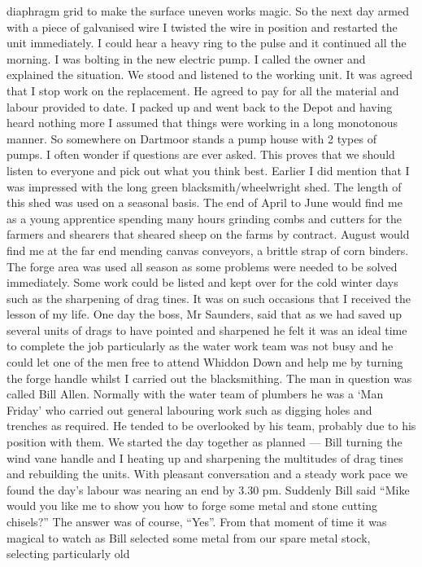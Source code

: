 diaphragm grid to make the surface uneven works magic. So the next day armed
with a piece of galvanised wire I twisted the wire in position and restarted
the unit immediately. I could hear a heavy ring to the pulse and it continued
all the morning. I was bolting in the new electric pump. I called the owner
and explained the situation. We stood and listened to the working unit. It
was agreed that I stop work on the replacement. He agreed to pay for all the
material and labour provided to date. I packed up and went back to the Depot
and having heard nothing more I assumed that things were working in a long
monotonous manner. So somewhere on Dartmoor stands a pump house with 2 types
of pumps.  I often wonder if questions are ever asked. This proves that we
should listen to everyone and pick out what you think best. Earlier I did
mention that I was impressed with the long green blacksmith/wheelwright shed.
The length of this shed was used on a seasonal basis. The end of April to June
would find me as a young apprentice spending many hours grinding combs and
cutters for the farmers and shearers that sheared sheep on the farms by
contract. August would find me at the far end mending canvas conveyors, a
brittle strap of corn binders. The forge area was used all season as some
problems were needed to be solved immediately. Some work could be listed and
kept over for the cold winter days such as the sharpening of drag tines. It
was on such occasions that I received the lesson of my life. One day the boss,
Mr Saunders, said that as we had saved up several units of drags to have
pointed and sharpened he felt it was an ideal time to complete the job
particularly as the water work team was not busy and he could let one of the
men free to attend Whiddon Down and help me by turning the forge handle whilst
I carried out the blacksmithing. The man in question was called Bill Allen.
Normally with the water team of plumbers he was a ‘Man Friday' who carried out
general labouring work such as digging holes and trenches as required. He
tended to be overlooked by his team, probably due to his position with them. We
started the day together as planned --- Bill turning the wind vane handle and I
heating up and sharpening the multitudes of drag tines and rebuilding the
units. With pleasant conversation and a steady work pace we found the day's
labour was nearing an end by 3.30 pm. Suddenly Bill said ``Mike would you like
me to show you how to forge some metal and stone cutting chisels?'' The answer
was of course, ``Yes''. From that moment of time it was magical to watch as
Bill selected some metal from our spare metal stock, selecting particularly old
